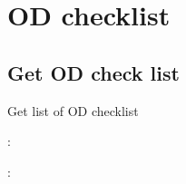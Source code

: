 \documentclass[letterpaper,10pt,english,openany,oneside]{sphinxmanual}
\begin{document}
\section{OD checklist}
\label{\detokenize{api-checklist/v1:od-checklist}}

\subsection{Get OD check list}
\label{\detokenize{api-checklist/v1:get-od-check-list}}

\begin{fulllineitems}
\label{\detokenize{api-checklist/v1:post--api-checklist-v1-od-list}}
\sphinxAtStartPar
Get list of OD checklist

\sphinxAtStartPar
{}:

\begin{sphinxVerbatim}[commandchars=\\\{\}]
\end{sphinxVerbatim}

\sphinxAtStartPar
{}:


\end{fulllineitems}
\end{document}

